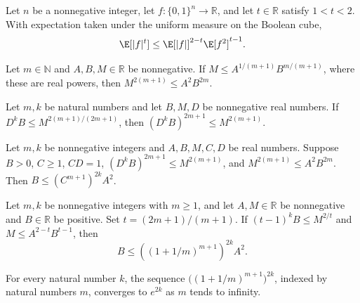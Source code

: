 \begin{lemma}
\leanok
{}
Let $n$ be a nonnegative integer, let $f\colon\{0,1\}^n\to\mathbb R$, and let
$t\in\mathbb R$ satisfy $1<t<2$. With expectation taken under the uniform measure on the
Boolean cube, $$\E[|f|^t]\leq \E[|f|]^{2-t}\E[f^2]^{t-1}.$$
\end{lemma}

\begin{lemma}
\leanok
{}
Let $m\in\mathbb N$ and $A,B,M\in\mathbb R$ be nonnegative. If $M\le
A^{1/(m+1)}B^{m/(m+1)}$, where these are real powers, then $M^{2(m+1)}\le A^2B^{2m}$.
\end{lemma}

\begin{lemma}
\leanok
{}
Let $m,k$ be natural numbers and let $B,M,D$ be nonnegative real numbers. If $D^kB\leq
M^{2(m+1)/(2m+1)}$, then $(D^kB)^{2m+1}\leq M^{2(m+1)}$.
\end{lemma}

\begin{lemma}
\leanok
{}
Let $m,k$ be nonnegative integers and $A,B,M,C,D$ be real numbers. Suppose $B>0$, $C\ge
1$, $CD=1$, $(D^kB)^{2m+1}\le M^{2(m+1)}$, and $M^{2(m+1)}\le A^2B^{2m}$. Then $B\le
(C^{m+1})^{2k}A^2$.
\end{lemma}

\begin{lemma}
\leanok
{}
Let $m,k$ be nonnegative integers with $m\ge1$, and let $A,M\in\mathbb R$ be nonnegative
and $B\in\mathbb R$ be positive. Set $t=(2m+1)/(m+1)$. If $(t-1)^kB\le M^{2/t}$ and
$M\le A^{2-t}B^{t-1}$, then
\[
B\le\left((1+1/m)^{m+1}\right)^{2k}A^2.
\]
\end{lemma}

\begin{theorem}
\leanok
{}
For every natural number $k$, the sequence $\bigl((1+1/m)^{m+1}\bigr)^{2k}$, indexed by
natural numbers $m$, converges to $e^{2k}$ as $m$ tends to infinity.
\end{theorem}

